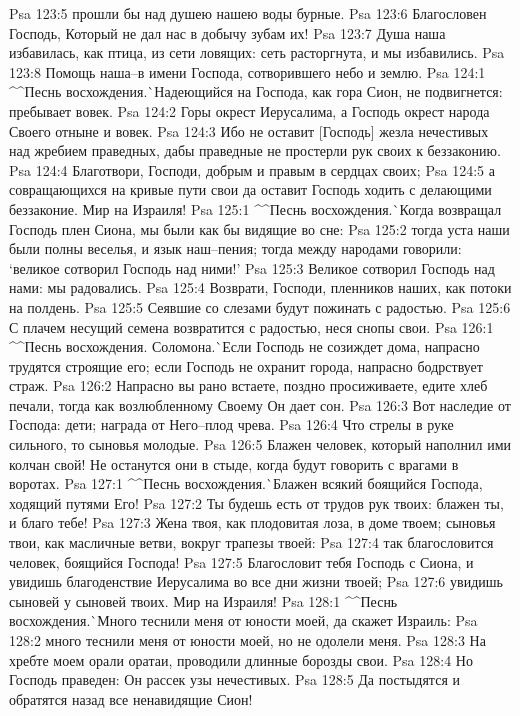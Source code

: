Psa 123:5  прошли бы над душею нашею воды бурные.
Psa 123:6  Благословен Господь, Который не дал нас в добычу зубам их!
Psa 123:7  Душа наша избавилась, как птица, из сети ловящих: сеть расторгнута, и мы избавились.
Psa 123:8  Помощь наша--в имени Господа, сотворившего небо и землю.
Psa 124:1  ^^Песнь восхождения.^^ Надеющийся на Господа, как гора Сион, не подвигнется: пребывает вовек.
Psa 124:2  Горы окрест Иерусалима, а Господь окрест народа Своего отныне и вовек.
Psa 124:3  Ибо не оставит [Господь] жезла нечестивых над жребием праведных, дабы праведные не простерли рук своих к беззаконию.
Psa 124:4  Благотвори, Господи, добрым и правым в сердцах своих;
Psa 124:5  а совращающихся на кривые пути свои да оставит Господь ходить с делающими беззаконие. Мир на Израиля!
Psa 125:1  ^^Песнь восхождения.^^ Когда возвращал Господь плен Сиона, мы были как бы видящие во сне:
Psa 125:2  тогда уста наши были полны веселья, и язык наш--пения; тогда между народами говорили: `великое сотворил Господь над ними!'
Psa 125:3  Великое сотворил Господь над нами: мы радовались.
Psa 125:4  Возврати, Господи, пленников наших, как потоки на полдень.
Psa 125:5  Сеявшие со слезами будут пожинать с радостью.
Psa 125:6  С плачем несущий семена возвратится с радостью, неся снопы свои.
Psa 126:1  ^^Песнь восхождения. Соломона.^^ Если Господь не созиждет дома, напрасно трудятся строящие его; если Господь не охранит города, напрасно бодрствует страж.
Psa 126:2  Напрасно вы рано встаете, поздно просиживаете, едите хлеб печали, тогда как возлюбленному Своему Он дает сон.
Psa 126:3  Вот наследие от Господа: дети; награда от Него--плод чрева.
Psa 126:4  Что стрелы в руке сильного, то сыновья молодые.
Psa 126:5  Блажен человек, который наполнил ими колчан свой! Не останутся они в стыде, когда будут говорить с врагами в воротах.
Psa 127:1  ^^Песнь восхождения.^^ Блажен всякий боящийся Господа, ходящий путями Его!
Psa 127:2  Ты будешь есть от трудов рук твоих: блажен ты, и благо тебе!
Psa 127:3  Жена твоя, как плодовитая лоза, в доме твоем; сыновья твои, как масличные ветви, вокруг трапезы твоей:
Psa 127:4  так благословится человек, боящийся Господа!
Psa 127:5  Благословит тебя Господь с Сиона, и увидишь благоденствие Иерусалима во все дни жизни твоей;
Psa 127:6  увидишь сыновей у сыновей твоих. Мир на Израиля!
Psa 128:1  ^^Песнь восхождения.^^ Много теснили меня от юности моей, да скажет Израиль:
Psa 128:2  много теснили меня от юности моей, но не одолели меня.
Psa 128:3  На хребте моем орали оратаи, проводили длинные борозды свои.
Psa 128:4  Но Господь праведен: Он рассек узы нечестивых.
Psa 128:5  Да постыдятся и обратятся назад все ненавидящие Сион!
